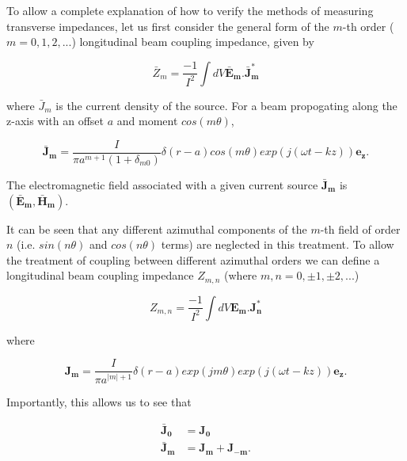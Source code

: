 \documentclass[12pt,a4paper,twopage,openright]{article}
\begin{document}
To allow a complete explanation of how to verify the methods of measuring transverse impedances, let us first consider the general form of the $m$-th order ($m = 0, 1, 2,...$) longitudinal beam coupling impedance, given by \cite{Chao:PhysColEff, Tsutsui:OnSingleWire}

\begin{equation}
\bar{Z}_{m} = \frac{-1}{I^{2}} \int dV \mathbf{\bar{E}_{m}. \bar{J}_{m}^{*}}
\end{equation}

where $\bar{J}_{m}$ is the current density of the source. For a beam propogating along the z-axis with an offset $a$ and moment $cos \left( m \theta \right)$,

\begin{equation}
\mathbf{\bar{J}_{m}} = \frac{I}{\pi a^{m +1} \left( 1 + \delta_{m0} \right)} \delta \left( r - a \right) cos \left( m \theta \right) exp \left( j \left( \omega t - k z  \right) \right) \mathbf{e_{z}}.
\end{equation}

The electromagnetic field associated with a given current source $\mathbf{\bar{J}_{m}}$ is $\left( \mathbf{\bar{E}_{m}}, \mathbf{\bar{H}_{m}} \right)$. 

It can be seen that any different azimuthal components of the $m$-th field of order $n$ (i.e. $sin \left( n\theta \right)$ and $cos \left( n\theta \right)$ terms) are neglected in this treatment. To allow the treatment of coupling between different azimuthal orders we can define a longitudinal beam coupling impedance $Z_{m,n}$ (where $m,n = 0, \pm 1, \pm 2, ... $)

\begin{equation}
Z_{m,n} = \frac{-1}{I^{2}} \int dV \mathbf{E_{m}. J_{n}^{*}}
\end{equation}

where

\begin{equation}
\mathbf{J_{m}} = \frac{I}{\pi a^{|m |+1}} \delta \left( r - a \right) exp \left(j m \theta \right) exp \left( j \left( \omega t - k z  \right) \right) \mathbf{e_{z}}.
\end{equation}

Importantly, this allows us to see that 

\begin{align}
\mathbf{\bar{J}_{0}} &= \mathbf{J_{0}} \nonumber \\
\mathbf{\bar{J}_{m}} &= \mathbf{J_{m}} + \mathbf{J_{-m}}.
\end{align}
\end{document}
